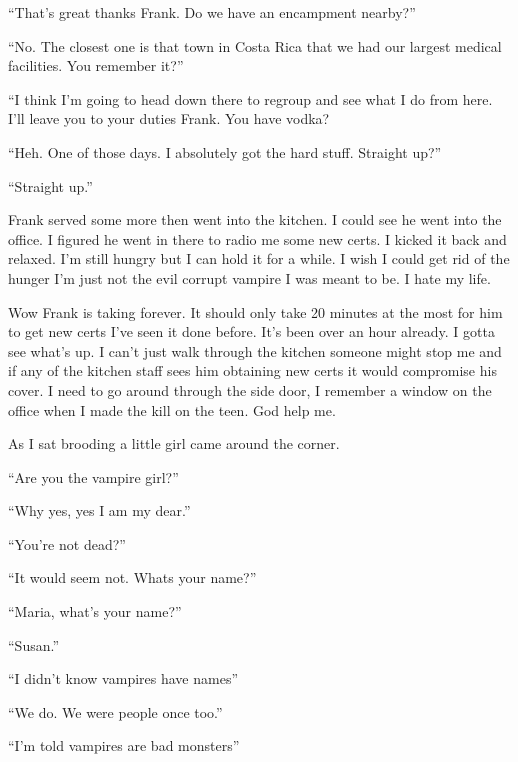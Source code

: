 ``That's great thanks Frank. Do we have an encampment nearby?''

``No. The closest one is that town in Costa Rica that we had our largest medical facilities. You remember it?''

``I think I'm going to head down there to regroup and see what I do from here. I'll leave you to your duties Frank. You have vodka?

``Heh. One of those days. I absolutely got the hard stuff. Straight up?''

``Straight up.''

Frank served some more then went into the kitchen. I could see he went into the office. I figured he went in there to radio me some new certs. I kicked it back and relaxed. I'm still hungry but I can hold it for a while. I wish I could get rid of the hunger I'm just not the evil corrupt vampire I was meant to be. I hate my life.

Wow Frank is taking forever. It should only take 20 minutes at the most for him to get new certs I've seen it done before. It's been over an hour already. I gotta see what's up. I can't just walk through the kitchen someone might stop me and if any of the kitchen staff sees him obtaining new certs it would compromise his cover. I need to go around through the side door, I remember a window on the office when I made the kill on the teen. God help me.





















As I sat brooding a little girl came around the corner.

``Are you the vampire girl?''

``Why yes, yes I am my dear.''

``You're not dead?''

``It would seem not. Whats your name?''

``Maria, what's your name?''

``Susan.''

``I didn't know vampires have names''

``We do. We were people once too.''

``I'm told vampires are bad monsters''

